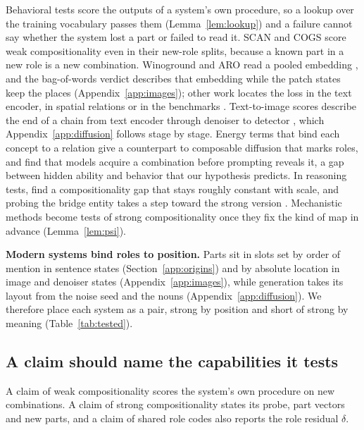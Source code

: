 Behavioral tests score the outputs of a system's own procedure, so a lookup over the training vocabulary passes them (Lemma~\ref{lem:lookup}) and a failure cannot say whether the system lost a part or failed to read it. SCAN and COGS \citep{lake2018,kim2020cogs,keysers2020,li2023slog} score weak compositionality even in their new-role splits, because a known part in a new role is a new combination. Winoground and ARO read a pooled embedding \citep{thrush2022winoground,yuksekgonul2023}, and the bag-of-words verdict describes that embedding while the patch states keep the places (Appendix~\ref{app:images}); other work locates the loss in the text encoder, in spatial relations or in the benchmarks \citep{kamath2023textenc,kamath2023whatsup,lewis2024clip,hsieh2023sugarcrepe}. Text-to-image scores describe the end of a chain from text encoder through denoiser to detector \citep{huang2023t2i,ghosh2023geneval,conwell2022,rassin2022}, which Appendix~\ref{app:diffusion} follows stage by stage. Energy terms that bind each concept to a relation \citep{liu2021relations} give a counterpart to composable diffusion that marks roles, and \citet{park2024hidden} find that models acquire a combination before prompting reveals it, a gap between hidden ability and behavior that our hypothesis predicts. In reasoning tests, \citet{press2023} find a compositionality gap that stays roughly constant with scale, and probing the bridge entity takes a step toward the strong version \citep{yang2024latent,biran2024hopping}. Mechanistic methods \citep{lepori2023,geiger2021,geiger2024das,mccoy2019,feng2024} become tests of strong compositionality once they fix the kind of map in advance (Lemma~\ref{lem:psi}).

\textbf{Modern systems bind roles to position.} Parts sit in slots set by order of mention in sentence states (Section~\ref{app:origins}) and by absolute location in image and denoiser states (Appendix~\ref{app:images}), while generation takes its layout from the noise seed and the nouns (Appendix~\ref{app:diffusion}). We therefore place each system as a pair, strong by position and short of strong by meaning (Table~\ref{tab:tested}).

\subsection{A claim should name the capabilities it tests}
\label{app:claims}

A claim of weak compositionality scores the system's own procedure on new combinations. A claim of strong compositionality states its probe, part vectors and new parts, and a claim of shared role codes also reports the role residual $\delta$.

